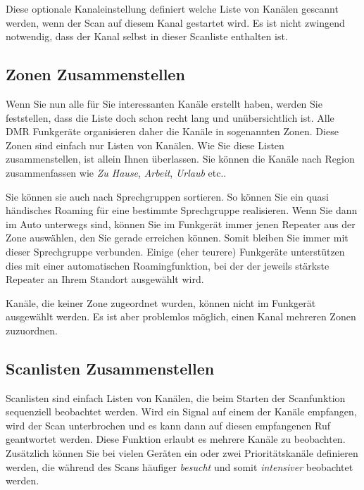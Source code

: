 Diese optionale Kanaleinstellung  definiert welche Liste von Kanälen gescannt werden, wenn der Scan auf diesem Kanal gestartet wird. Es ist nicht zwingend notwendig, dass der Kanal selbst in dieser Scanliste enthalten ist.


\subsection{Zonen Zusammenstellen} \label{sec:zone} 
Wenn Sie nun alle für Sie interessanten Kanäle erstellt haben, werden Sie feststellen, dass die Liste doch schon recht lang und unübersichtlich ist. Alle DMR Funkgeräte organisieren daher die Kanäle in sogenannten Zonen. Diese Zonen sind einfach nur Listen von Kanälen. Wie Sie diese Listen zusammenstellen, ist allein Ihnen überlassen. Sie können die Kanäle nach Region zusammenfassen wie \emph{Zu Hause}, \emph{Arbeit}, \emph{Urlaub} etc.. 

Sie können sie auch nach Sprechgruppen sortieren. So können Sie ein quasi händisches Roaming für eine bestimmte Sprechgruppe realisieren. Wenn Sie dann im Auto unterwegs sind, können Sie im Funkgerät immer jenen Repeater aus der Zone auswählen, den Sie gerade erreichen können. Somit bleiben Sie immer mit dieser Sprechgruppe verbunden. Einige (eher teurere) Funkgeräte unterstützen dies mit einer automatischen Roamingfunktion, bei der der jeweils stärkste Repeater an Ihrem Standort ausgewählt wird.

\begin{hinweis}
 Kanäle, die keiner Zone zugeordnet wurden, können nicht im Funkgerät ausgewählt werden. Es ist aber problemlos möglich, einen Kanal mehreren Zonen zuzuordnen.
\end{hinweis}

\subsection{Scanlisten Zusammenstellen}
Scanlisten sind einfach Listen von Kanälen, die beim Starten der Scanfunktion sequenziell beobachtet werden. Wird ein Signal auf einem der Kanäle empfangen, wird der Scan unterbrochen und es kann dann auf diesen empfangenen Ruf geantwortet werden. Diese Funktion erlaubt es mehrere Kanäle zu beobachten. Zusätzlich können Sie bei vielen Geräten ein oder zwei Prioritätskanäle definieren werden, die während des Scans häufiger \emph{besucht} und somit \emph{intensiver} beobachtet werden.

